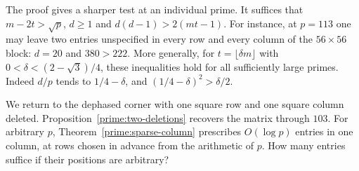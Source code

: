 \documentclass[11pt,a4paper]{article}
\numberwithin{equation}{section}
\begin{document}
The proof gives a sharper test at an individual prime. It suffices that $m-2t>\sqrt p$, $d\ge1$ and $d(d-1)>2(mt-1)$. For instance, at $p=113$ one may leave two entries unspecified in every row and every column of the $56\times56$ block: $d=20$ and $380>222$. More generally, for $t=\lfloor\delta m\rfloor$ with $0<\delta<(2-\sqrt3)/4$, these inequalities hold for all sufficiently large primes. Indeed $d/p$ tends to $1/4-\delta$, and $(1/4-\delta)^2>\delta/2$.

We return to the dephased corner with one square row and one square column deleted. Proposition~\ref{prime:two-deletions} recovers the matrix through $103$. For arbitrary $p$, Theorem~\ref{prime:sparse-column} prescribes $O(\log p)$ entries in one column, at rows chosen in advance from the arithmetic of $p$. How many entries suffice if their positions are arbitrary?
\end{document}
